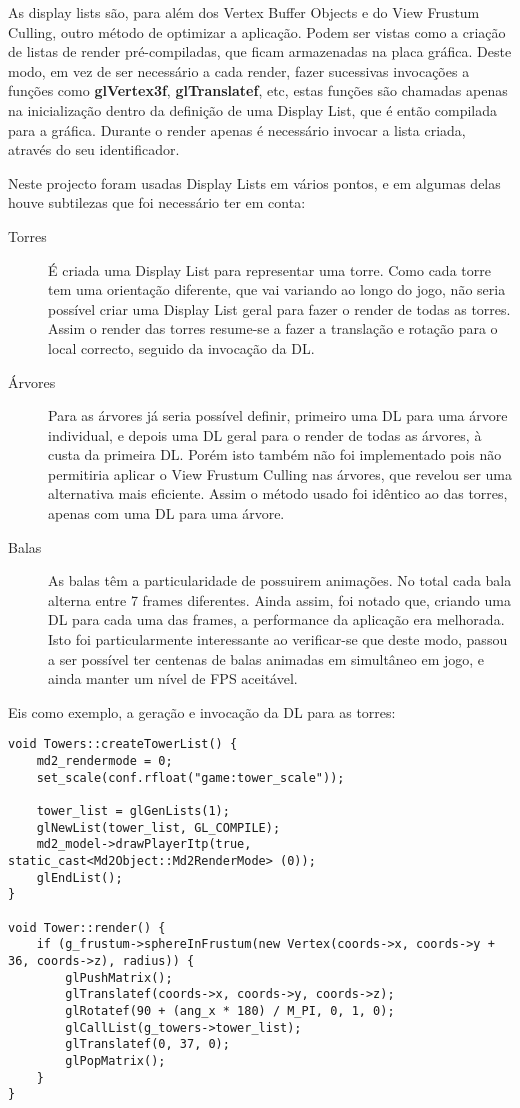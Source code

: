 As display lists são, para além dos Vertex Buffer Objects e do View Frustum Culling, outro método de optimizar a aplicação. Podem ser vistas como a criação de listas de render pré-compiladas, que ficam armazenadas na placa gráfica. Deste modo, em vez de ser necessário a cada render, fazer sucessivas invocações a funções como \textbf{glVertex3f}, \textbf{glTranslatef}, etc, estas funções são chamadas apenas na inicialização dentro da definição de uma Display List, que é então compilada para a gráfica.
Durante o render apenas é necessário invocar a lista criada, através do seu identificador.

Neste projecto foram usadas Display Lists em vários pontos, e em algumas delas houve subtilezas que foi necessário ter em conta:
\begin{description}
\item[Torres] É criada uma Display List para representar uma torre. Como cada torre tem uma orientação diferente, que vai variando ao longo do jogo, não seria possível criar uma Display List geral para fazer o render de todas as torres. Assim o render das torres resume-se a fazer a translação e rotação para o local correcto, seguido da invocação da DL.
\item[Árvores] Para as árvores já seria possível definir, primeiro uma DL para uma árvore individual, e depois uma DL geral para o render de todas as árvores, à custa da primeira DL.
Porém isto também não foi implementado pois não permitiria aplicar o View Frustum Culling nas árvores, que revelou ser uma alternativa mais eficiente. Assim o método usado foi idêntico ao das torres, apenas com uma DL para uma árvore.
\item[Balas] As balas têm a particularidade de possuirem animações. No total cada bala alterna entre 7 frames diferentes. Ainda assim, foi notado que, criando uma DL para cada uma das frames, a performance da aplicação era melhorada. Isto foi particularmente interessante ao verificar-se que deste modo, passou a ser possível ter centenas de balas animadas em simultâneo em jogo, e ainda manter um nível de FPS aceitável.
\end{description}

Eis como exemplo, a geração e invocação da DL para as torres:

\begin{lstlisting}[caption=Displays Lists para as Torres]
void Towers::createTowerList() {
    md2_rendermode = 0;
    set_scale(conf.rfloat("game:tower_scale"));
	
	tower_list = glGenLists(1);
	glNewList(tower_list, GL_COMPILE);
	md2_model->drawPlayerItp(true, static_cast<Md2Object::Md2RenderMode> (0));
	glEndList();
}

void Tower::render() {
    if (g_frustum->sphereInFrustum(new Vertex(coords->x, coords->y + 36, coords->z), radius)) {
        glPushMatrix();
        glTranslatef(coords->x, coords->y, coords->z);
        glRotatef(90 + (ang_x * 180) / M_PI, 0, 1, 0);
        glCallList(g_towers->tower_list);
        glTranslatef(0, 37, 0);
        glPopMatrix();
    }
}
\end{lstlisting}
